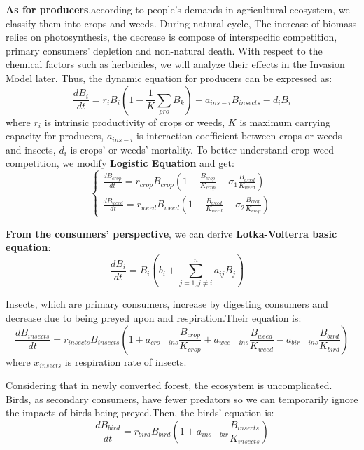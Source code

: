\documentclass[12pt]{article}
\begin{document}
	\textbf{As for producers},according to people's demands in agricultural ecosystem, we classify them into crops and weeds. During natural cycle, The increase of biomass relies on photosynthesis, the decrease is compose of interspecific competition, primary consumers' depletion and non-natural death. With respect to the chemical factors such as herbicides, we will analyze their effects in the Invasion Model later. Thus, the dynamic equation for producers can be expressed as:
	\begin{equation}
		\frac{dB_i}{dt}=r_iB_i(1-\frac{1}{K}\sum_{pro}B_k)-a_{ins-i}B_{insects}-d_iB_i
	\end{equation}
	where $r_i$ is intrinsic productivity of crops or weeds, $K$ is maximum carrying capacity for producers, $a_{ins-i}$ is interaction coefficient between crops or weeds and insects, $d_i$ is crops' or weeds' mortality.
	To better understand crop-weed competition, we modify \textbf{Logistic Equation} and get:
	\begin{equation}
		\begin{cases}
			\frac{dB_{crop}}{dt}=r_{crop}B_{crop}(1-\frac{B_{crop}}{K_{crop}}-\sigma_1\frac{B_{weed}}{K_{weed}})\\
			\frac{dB_{weed}}{dt}=r_{weed}B_{weed}(1-\frac{B_{weed}}{K_{weed}}-\sigma_2\frac{B_{crop}}{K_{crop}})
		\end{cases}
	\end{equation}
	
	\textbf{From the consumers' perspective}, we can derive \textbf{Lotka-Volterra  basic equation}:
	\begin{equation}
		\frac{dB_i}{dt}=B_i(b_i+\sum_{j=1,j\neq i}^n a_{ij}B_j)\hspace{1em}
	\end{equation}
	
	Insects, which are primary consumers, increase by digesting consumers and decrease due to being preyed upon and respiration.Their equation is:
	\begin{equation}
		\frac{dB_{insects}}{dt}=r_{insects}B_{insects}(1+a_{cro-ins}\frac{B_{crop}}{K_{crop}}+a_{wee-ins}\frac{B_{weed}}{K_{weed}}-a_{bir-ins}\frac{B_{bird}}{K_{bird}})
	\end{equation}
	where $x_{insects}$ is respiration rate of insects.
	
	Considering that in newly converted forest, the ecosystem is uncomplicated. Birds, as secondary consumers, have fewer predators so we can temporarily ignore the impacts of birds being preyed.Then, the birds' equation is:
	\begin{equation}
		\frac{dB_{bird}}{dt}=r_{bird}B_{bird}(1+a_{ins-bir}\frac{B_{insects}}{K_{insects}})
	\end{equation}
	
\end{document}
